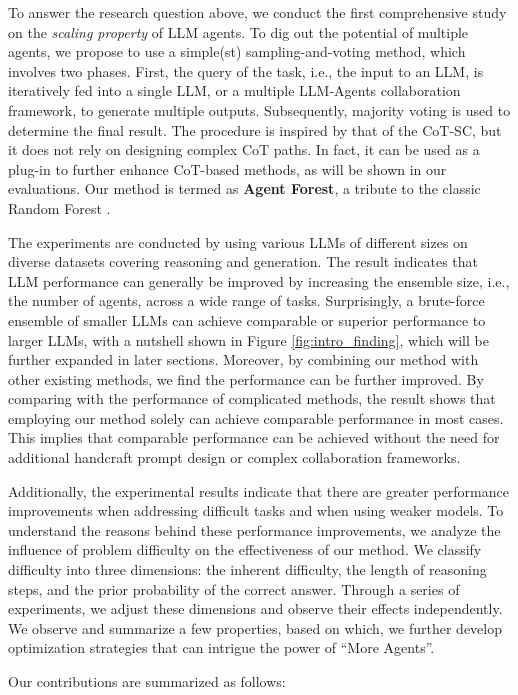 To answer the research question above, we conduct the first comprehensive study on the \textit{scaling property} of LLM agents. 
To dig out the potential of multiple agents, we propose to use a simple(st) sampling-and-voting method, which involves two phases. 
First, the query of the task, i.e., the input to an LLM, is iteratively fed into a single LLM, or a multiple LLM-Agents collaboration framework, to generate multiple outputs. Subsequently, majority voting is used to determine the final result. 
The procedure is inspired by that of the CoT-SC, but it does not rely on designing complex CoT paths. 
In fact, it can be used as a plug-in to further enhance CoT-based methods, as will be shown in our evaluations. 
Our method is termed as \textbf{Agent Forest}, a tribute to the classic Random Forest \citep{breiman2001random}. 

The experiments are conducted by using various LLMs of different sizes on diverse datasets covering reasoning and generation. The result indicates that LLM performance can generally be improved by increasing the ensemble size, i.e., the number of agents, across a wide range of tasks. Surprisingly, a brute-force ensemble of smaller LLMs can achieve comparable or superior performance to larger LLMs, with a nutshell shown in Figure \ref{fig:intro_finding}, which will be further expanded in later sections. 
Moreover, by combining our method with other existing methods, we find the performance can be further improved. By comparing with the performance of complicated methods, the result shows that employing our method solely can achieve comparable performance in most cases. 
This implies that comparable performance can be achieved without the need for additional handcraft prompt design or complex collaboration frameworks.

Additionally, the experimental results indicate that there are greater performance improvements when addressing difficult tasks and when using weaker models. To understand the reasons behind these performance improvements, we analyze the influence of problem difficulty on the effectiveness of our method. We classify difficulty into three dimensions: the inherent difficulty, the length of reasoning steps, and the prior probability of the correct answer. Through a series of experiments, we adjust these dimensions and observe their effects independently. 
We observe and summarize a few properties, based on which, we further develop optimization strategies that can intrigue the power of ``More Agents''. 

Our contributions are summarized as follows:

